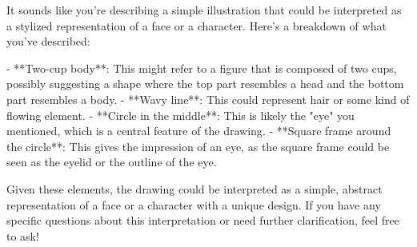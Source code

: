 It sounds like you're describing a simple illustration that could be interpreted as a stylized representation of a face or a character. Here's a breakdown of what you've described:

- **Two-cup body**: This might refer to a figure that is composed of two cups, possibly suggesting a shape where the top part resembles a head and the bottom part resembles a body.
- **Wavy line**: This could represent hair or some kind of flowing element.
- **Circle in the middle**: This is likely the "eye" you mentioned, which is a central feature of the drawing.
- **Square frame around the circle**: This gives the impression of an eye, as the square frame could be seen as the eyelid or the outline of the eye.

Given these elements, the drawing could be interpreted as a simple, abstract representation of a face or a character with a unique design. If you have any specific questions about this interpretation or need further clarification, feel free to ask!